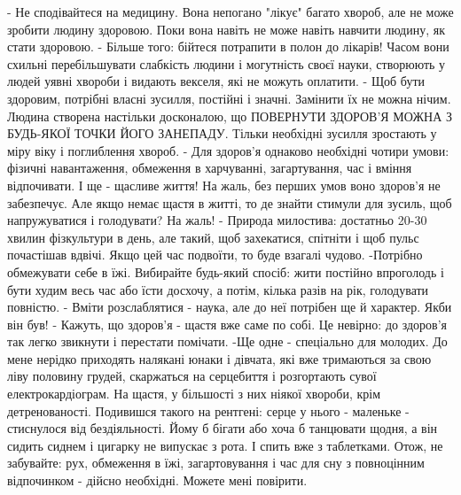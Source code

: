 - Не сподівайтеся на медицину. Вона непогано "лікує" багато хвороб, але не може зробити людину здоровою. Поки вона навіть не може навіть навчити людину, як стати здоровою.
- Більше того: бійтеся потрапити в полон до лікарів! Часом вони схильні перебільшувати слабкість людини і могутність своєї науки, створюють у людей уявні хвороби і видають векселя, які не можуть оплатити.
- Щоб бути здоровим, потрібні власні зусилля, постійні і значні. Замінити їх не можна нічим. Людина створена настільки досконалою, що ПОВЕРНУТИ ЗДОРОВ'Я МОЖНА З БУДЬ-ЯКОЇ ТОЧКИ ЙОГО ЗАНЕПАДУ. Тільки необхідні зусилля зростають у міру віку і поглиблення хвороб.
- Для здоров'я однаково необхідні чотири умови: фізичні навантаження, обмеження в харчуванні, загартування, час і вміння відпочивати. І ще - щасливе життя! На жаль, без перших умов воно здоров'я не забезпечує. Але якщо немає щастя в житті, то де знайти стимули для зусиль, щоб напружуватися і голодувати? На жаль!
- Природа милостива: достатньо 20-30 хвилин фізкультури в день, але такий, щоб захекатися, спітніти і щоб пульс почастішав вдвічі. Якщо цей час подвоїти, то буде взагалі чудово.
-Потрібно обмежувати себе в їжі. Вибирайте будь-який спосіб: жити постійно впроголодь і бути худим весь час або їсти досхочу, а потім, кілька разів на рік, голодувати повністю.
- Вміти розслаблятися - наука, але до неї потрібен ще й характер. Якби він був!
- Кажуть, що здоров'я - щастя вже саме по собі. Це невірно: до здоров'я так легко звикнути і перестати помічати. 
-Ще одне - спеціально для молодих. До мене нерідко приходять налякані юнаки і дівчата, які вже тримаються за свою ліву половину грудей, скаржаться на серцебиття і розгортають сувої електрокардіограм. На щастя, у більшості з них ніякої хвороби, крім детренованості. Подивишся такого на рентгені: серце у нього - маленьке - стиснулося від бездіяльності. Йому б бігати або хоча б танцювати щодня, а він сидить сиднем і цигарку не випускає з рота. І спить вже з таблетками. 
Отож, не забувайте: рух, обмеження в їжі, загартовування і час для сну з повноцінним відпочинком - дійсно необхідні. Можете мені повірити.
